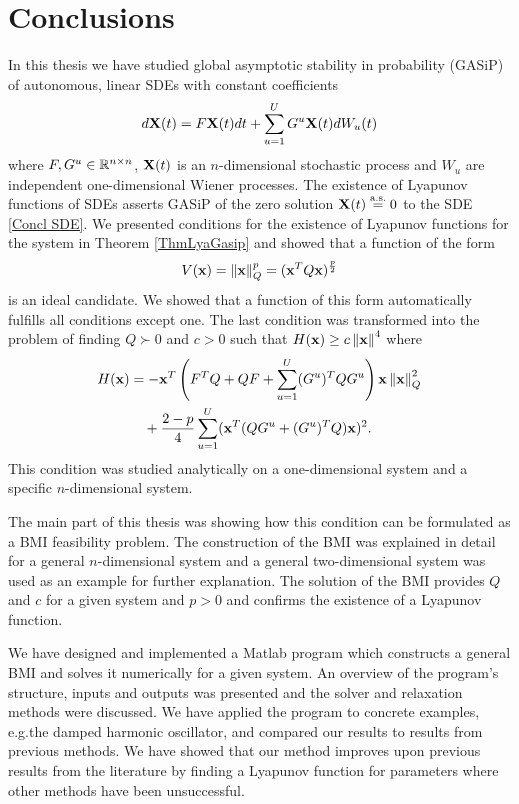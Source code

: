 \documentclass[a4paper,12pt,twoside,BCOR=10mm]{scrbook}
\begin{document}
\chapter{Conclusions}
In this thesis we have studied global asymptotic stability in probability (GASiP) of autonomous, linear SDEs with constant coefficients
\begin{align}\label{Concl SDE}
    d\mathbf{X}(t) = F\mathbf{X}(t)dt + \sum\limits_{u = 1}^UG^u \mathbf{X}(t)dW_u(t)
\end{align}
where $F,G^u \in \mathbb{R}^{n\times n}$, $\mathbf{X}(t)$ is an $n$-dimensional stochastic process and $W_u$ are independent one-dimensional Wiener processes. The existence of Lyapunov functions of SDEs asserts GASiP of the zero solution $\mathbf{X}(t) \stackrel{\text{a.s.}}{=} 0$ to the SDE \eqref{Concl SDE}. We presented conditions for the existence of Lyapunov functions for the system in Theorem \ref{ThmLyaGasip} and showed that a function of the form
\begin{align*}
    V(\mathbf{x}) = \left\lVert\mathbf{x}\right\rVert_Q^p = (\mathbf{x}^T Q \mathbf{x})^\frac{p}{2}
\end{align*}
is an ideal candidate. We showed that a function of this form automatically fulfills all conditions except one. The last condition was transformed into the problem of finding $Q \succ 0$ and $c > 0$ such that $H(\mathbf{x}) \geq c\left\lVert\mathbf{x}\right\rVert_{}^{4}$ where
\begin{align*}
    H(\mathbf{x}) &= -\mathbf{x}^T \left(F^T Q + QF + \sum_{u = 1}^U (G^u)^TQG^u\right) \mathbf{x}\left\lVert\mathbf{x}\right\rVert_{Q}^{2}\\
    &\quad+ \frac{2 - p}{4} \sum_{u = 1}^U (\mathbf{x}^T (QG^u + (G^u)^TQ)\mathbf{x})^2.
\end{align*}
This condition was studied analytically on a one-dimensional system and a specific $n$-dimensional system.

The main part of this thesis was showing how this condition can be formulated as a BMI feasibility problem. The construction of the BMI was explained in detail for a general $n$-dimensional system and a general two-dimensional system was used as an example for further explanation. The solution of the BMI provides $Q$ and $c$ for a given system and $p > 0$ and confirms the existence of a Lyapunov function.

We have designed and implemented a Matlab program which constructs a general BMI and solves it numerically for a given system. An overview of the program's structure, inputs and outputs was presented and the solver and relaxation methods were discussed. We have applied the program to concrete examples, e.g.\@ the damped harmonic oscillator, and compared our results to results from previous methods. We have showed that our method improves upon previous results from the literature by finding a Lyapunov function for parameters where other methods have been unsuccessful.


\end{document}
